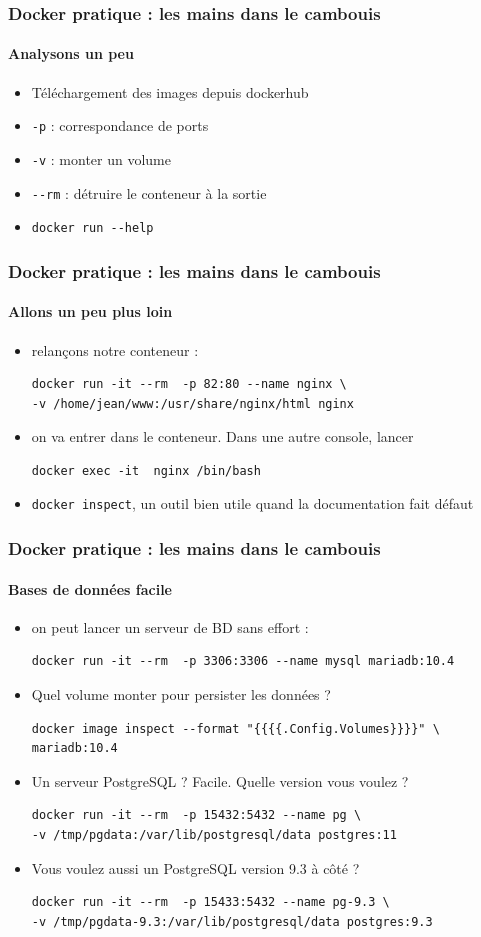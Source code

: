 \documentclass[11pt]{beamer}
\begin{document}
\begin{frame}[fragile]
\frametitle{Docker pratique : les mains dans le cambouis }
\framesubtitle{Analysons un peu}
\begin{itemize}
\item Téléchargement des images depuis dockerhub
\item \verb|-p| : correspondance de ports
\item \verb|-v| : monter un volume
\item \verb|--rm| : détruire le conteneur à la sortie
\item \verb|docker run --help|
\end{itemize}
\end{frame}

\begin{frame}[fragile]
\frametitle{Docker pratique : les mains dans le cambouis }
\framesubtitle{Allons un peu plus loin}
\begin{itemize}
	\item relançons notre conteneur : 
	\begin{lstlisting}
docker run -it --rm  -p 82:80 --name nginx \
-v /home/jean/www:/usr/share/nginx/html nginx
	\end{lstlisting}
	\item on va entrer dans le conteneur. Dans une autre console, lancer
	\begin{lstlisting}
docker exec -it  nginx /bin/bash
	\end{lstlisting}
	\item \verb|docker inspect|, un outil bien utile quand la documentation fait défaut
\end{itemize}
\end{frame}

\begin{frame}[fragile]
\frametitle{Docker pratique : les mains dans le cambouis }
\framesubtitle{Bases de données facile}
\begin{itemize}
	\item on peut lancer un serveur de BD sans effort : 
	\begin{lstlisting}
docker run -it --rm  -p 3306:3306 --name mysql mariadb:10.4
	\end{lstlisting}
	\item Quel volume monter pour persister les données ?
	\begin{lstlisting}
docker image inspect --format "{{{{.Config.Volumes}}}}" \
mariadb:10.4
	\end{lstlisting}
	\item Un serveur PostgreSQL ? Facile. Quelle version vous voulez ?
	\begin{lstlisting}
docker run -it --rm  -p 15432:5432 --name pg \ 
-v /tmp/pgdata:/var/lib/postgresql/data postgres:11
	\end{lstlisting}
	\item Vous voulez aussi un PostgreSQL version 9.3 à côté ?
	\begin{lstlisting}
docker run -it --rm  -p 15433:5432 --name pg-9.3 \
-v /tmp/pgdata-9.3:/var/lib/postgresql/data postgres:9.3
	\end{lstlisting}
\end{itemize}
\end{frame}
\end{document}
